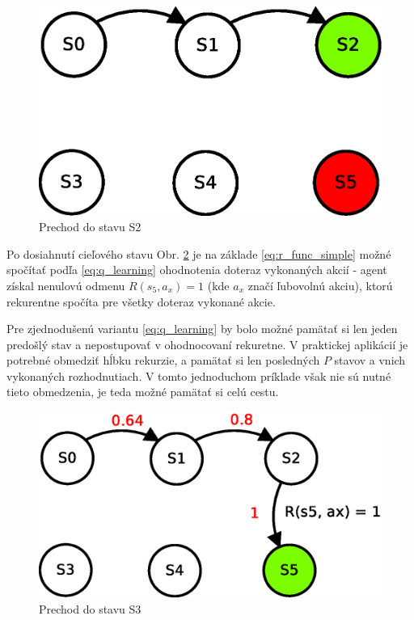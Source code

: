 \begin{figure}[!htb]
\center
\includegraphics[scale=.6]{../diagrams/q_learning_table_03.eps}
\caption{Prechod do stavu S2}
\label{img:q_learning_3}
\end{figure}

Po dosiahnutí cieľového stavu Obr. \ref{img:q_learning_4} je na základe \ref{eq:r_func_simple}
možné spočítať podľa \ref{eq:q_learning} ohodnotenia doteraz vykonaných akcií -
agent získal nenulovú odmenu $R(s_5, a_x) = 1$ (kde $a_x$ značí ľubovolnú akciu),
ktorú rekurentne spočíta pre všetky doteraz vykonané akcie.

Pre zjednodušenú variantu \ref{eq:q_learning} by bolo možné pamätať si len jeden
predošlý stav a nepostupovať v ohodnocovaní rekuretne. V praktickej aplikácií
je potrebné obmedziť hĺbku rekurzie, a pamätať si len posledných $P$ stavov a vnich
vykonaných rozhodnutiach. V tomto jednoduchom príklade však nie sú nutné tieto obmedzenia, je teda
možné pamätať si celú cestu.

\begin{figure}[!htb]
\center
\includegraphics[scale=.6]{../diagrams/q_learning_table_04.eps}
\caption{Prechod do stavu S3}
\label{img:q_learning_4}
\end{figure}

